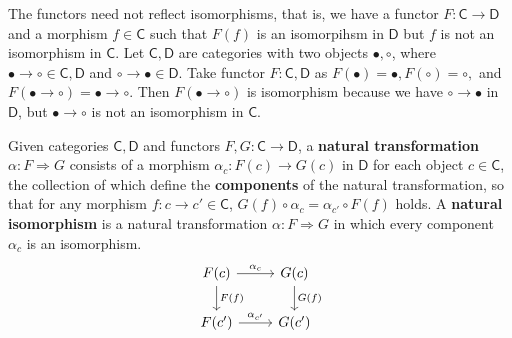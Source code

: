\begin{exmp} The functors need not reflect isomorphisms, that is, we have a functor $F:\mathsf{C}\rightarrow \mathsf{D}$ and a morphism $f\in\mathsf{C}$ such that $F(f)$ is an isomorpihsm in $\mathsf{D}$ but $f$ is not an isomorphism in $\mathsf{C}$. Let $\mathsf{C},\mathsf{D}$ are categories with two objects $\bullet,\circ$, where $\bullet\rightarrow \circ\in\mathsf{C},\mathsf{D}$ and $\circ\rightarrow \bullet\in\mathsf{D}$. Take functor $F:\mathsf{C},\mathsf{D}$ as $F(\bullet)=\bullet, F(\circ)=\circ,$ and $F(\bullet\rightarrow\circ)=\bullet\rightarrow \circ$. Then $F(\bullet\rightarrow\circ)$ is isomorphism because we have $\circ\rightarrow \bullet$ in $\mathsf{D}$, but $\bullet\rightarrow \circ$ is not an isomorphism in $\mathsf{C}$.
\end{exmp}

\begin{defn} Given categories $\mathsf{C},\mathsf{D}$ and functors $F,G:\mathsf{C}\rightarrow \mathsf{D}$, a \textbf{natural transformation} $\alpha:F\Rightarrow G$ consists of a morphism $\alpha_c:F(c)\rightarrow G(c)$ in $\mathsf{D}$ for each object $c\in\mathsf{C}$, the collection of which define the \textbf{components} of the natural transformation, so  that for any morphism $f:c\rightarrow c'\in\mathsf{C}$, $G(f)\circ \alpha_c=\alpha_{c'}\circ F(f)$ holds. A \textbf{natural isomorphism} is a natural transformation $\alpha:F\Rightarrow G$ in which every component $\alpha_c$ is an isomorphism.
\begin{equation}
\begin{tikzcd}
F(c)\arrow{r}{\alpha_c} \arrow{d}{F(f)}&G(c)\arrow{d}{G(f)}\\
F(c')\arrow{r}{\alpha_{c'}} & G(c')
\end{tikzcd}
\end{equation}
\end{defn}


